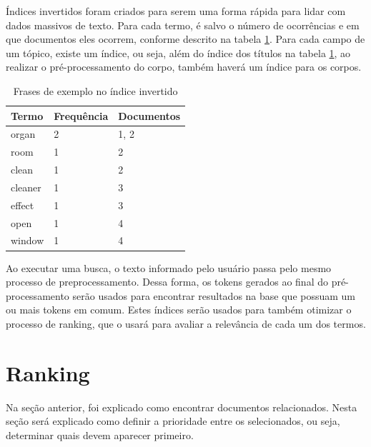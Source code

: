 Índices invertidos foram criados para serem uma forma rápida para lidar com dados massivos de texto. Para cada termo, é salvo o número de ocorrências e em que documentos eles ocorrem, conforme descrito na tabela \ref{tab:invertedindex}. Para cada campo de um tópico, existe um índice, ou seja, além do índice dos títulos na tabela \ref{tab:invertedindex}, ao realizar o pré-processamento do corpo, também haverá um índice para os corpos. 

\begin{table}[htb]
	\centering
    \def\arraystretch{1.2} 
    \begin{tabular}{|l|l|l|}
        \hline
        \textbf{Termo} & \textbf{Frequência} & \textbf{Documentos} \\ \hline
        organ & 2  & 1, 2            \\ \hline
        room & 1  & 2 \\ \hline
        clean & 1  & 2                              \\ \hline
        cleaner & 1  & 3                             \\ \hline
        effect & 1  & 3                             \\ \hline
        open & 1  & 4                             \\ \hline
        window & 1  & 4                             \\ \hline
    \end{tabular}
	\caption{Frases de exemplo no índice invertido}
    \label{tab:invertedindex}
\end{table}
Ao executar uma busca, o texto informado pelo usuário passa pelo mesmo processo de preprocessamento. Dessa forma, os tokens gerados ao final do pré-processamento serão usados para encontrar resultados na base que possuam um ou mais tokens em comum. Estes índices serão usados para também otimizar o processo de ranking, que o usará para avaliar a relevância de cada um dos termos.

\section{Ranking}
Na seção anterior, foi explicado como encontrar documentos relacionados. Nesta seção será explicado como definir a prioridade entre os selecionados, ou seja, determinar quais devem aparecer primeiro.

